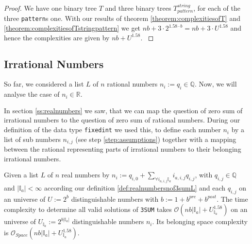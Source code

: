 \begin{proof}
    We have one binary tree $T$ and three binary trees $T^{string}_{pattern}$, for each of the three \texttt{pattern}s one. With our results of theorem \ref{theorem:complexitiesofT} and \ref{theorem:complexitiesofTstringpattern} we get $nb + 3 \cdot 2^{1.58 \cdot b} = nb + 3 \cdot U^{1.58}$ and hence the complexities are given by $nb + U^{1.58}$.
\label{proof:complexitiesof3sumrationalnumbers}
\end{proof}
\subsection{Irrational Numbers}
\label{ss:irrationalnumbers}
So far, we considered a list $L$ of $n$ rational numbers $n_{i} := q_{i} \in \mathbb{Q}$. Now, we will analyse the case of $n_{i} \in \mathbb{R}$.

In section \ref{ss:realnumbers} we saw, that we can map the question of zero sum of irrational numbers to the question of zero sum of rational numbers. During our definition of the data type \texttt{fixedint} we used this, to define each number $n_{i}$ by a list of sub numbers $n_{i,j}$ (see step \ref{step:assumptions}) together with a mapping between the rational representing parts of irrational numbers to their belonging irrational numbers.


\begin{theorem}
    Given a list $L$ of $n$ real numbers by $n_{i} := q_{i,0} + \sum_{ \forall i_{a,i,j} \mathbb{I}_{a}} i_{a,i,j}q_{i,j}$, with $q_{i,j} \in \mathbb{Q}$ and $|\mathbb{I}_{a}| < \infty$ according our definition \ref{def:realnumbersnof3sumL} and each $q_{i,j}$ on an universe of $U := 2^{b}$ distinguishable numbers with $b := 1 + b^{pre} + b^{post}$. The time complexity to determine all valid solutions of \texttt{3SUM} takes $\mathcal{O}\left(nb|\mathbb{I}_{a}| + U^{1.58}_{\mathbb{I}_{a}}\right)$ on an universe of $U_{\mathbb{I}_{a}} := 2^{b |\mathbb{I}_{a}|}$ distinguishable numbers $n_{i}$. Its belonging space complexity is $\mathcal{O}_{Space}\left(nb|\mathbb{I}_{a}| + U^{1.58}_{\mathbb{I}_{a}}\right)$.
\label{theorem:complexitiesof3sumrealnumbers}
\end{theorem}


